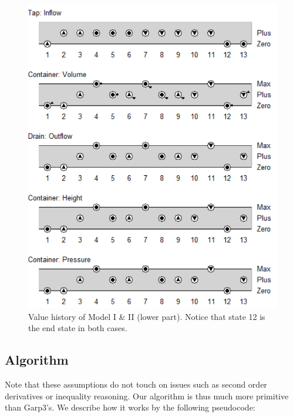 \documentclass{article}
\begin{document}
\begin{figure}[!h]
	\includegraphics{Value_History_Extra}
	\caption{Value history of Model I \& II (lower part). Notice that state 12 is the end state in both cases.}
	\label{figure9}
\end{figure}

\pagebreak

\subsection{Algorithm}

Note that these assumptions do not touch on issues such as second order derivatives or inequality reasoning. Our algorithm is thus much more primitive than Garp3's. We describe how it works by the following pseudocode:\\\\
\end{document}
